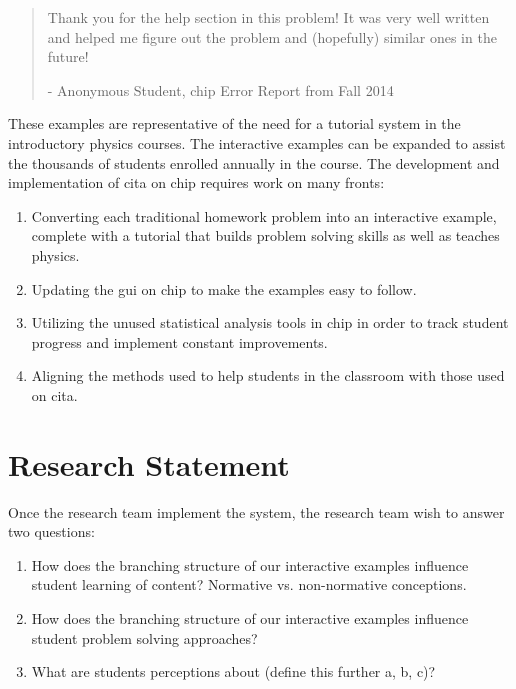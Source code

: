 \begin{quote}
Thank you for the help section in this problem! It was very well written and helped me figure out the problem and (hopefully) similar ones in the future!

- Anonymous Student, \gls{chip} Error Report from Fall 2014
\end{quote}

These examples are representative of the need for a tutorial system in the introductory physics courses. The interactive examples can be expanded to assist the thousands of students enrolled annually in the course. The development and implementation of \gls{cita} on \gls{chip} requires work on many fronts:

\begin{enumerate}
\item Converting each traditional homework problem into an interactive example, complete with a tutorial that builds problem solving skills as well as teaches physics.
\item Updating the \gls{gui} on \gls{chip} to make the examples easy to follow.
\item Utilizing the unused statistical analysis tools in \gls{chip} in order to track student progress and implement constant improvements.
\item Aligning the methods used to help students in the classroom with those used on \gls{cita}.
\end{enumerate}

\section{Research Statement}

Once the research team implement the system, the research team wish to answer two questions:

\begin{enumerate}
\item How does the branching structure of our interactive examples influence student learning of content? Normative vs. non-normative conceptions.
\item How does the branching structure of our interactive examples influence student problem solving approaches?
\item What are students perceptions about (define this further a, b, c)?
\end{enumerate}
